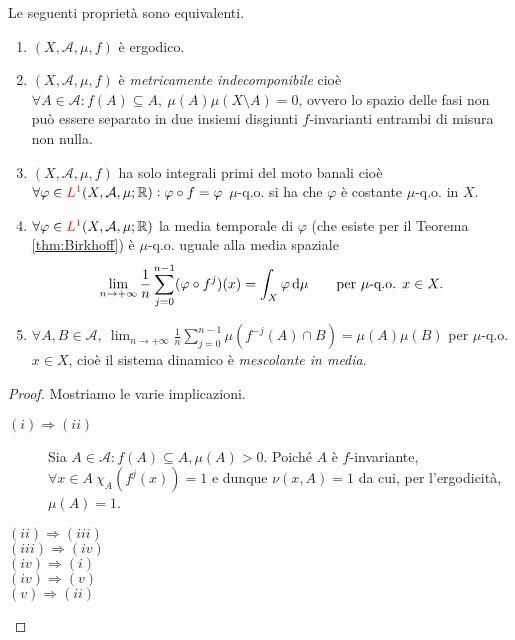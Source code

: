 \begin{thm}
    Le seguenti proprietà sono equivalenti.
    \begin{enumerate}[label=(\roman*)]
        \item $ (X, \mathcal{A}, \mu, f) $ è ergodico.
        \item $ (X, \mathcal{A}, \mu, f) $ è \emph{metricamente indecomponibile} cioè $ \forall A \in \mathcal{A} : f(A) \subseteq A, \ \mu(A) \mu(X \setminus A) = 0 $, ovvero lo spazio delle fasi non può essere separato in due insiemi disgiunti $ f $-invarianti entrambi di misura non nulla.
        \item $ (X, \mathcal{A}, \mu, f) $ ha solo integrali primi del moto banali cioè $ \forall \varphi \in \textcolor{red}{L^1}(X, \mathcal{A}, \mu; \mathbb{R}) : \varphi \circ f = \varphi $ $ \mu $-q.o. si ha che $ \varphi $ è costante $ \mu $-q.o. in $ X $.
        \item $ \forall \varphi \in \textcolor{red}{L^1}(X, \mathcal{A}, \mu; \mathbb{R}) $ la media temporale di $ \varphi $ (che esiste per il Teorema \ref{thm:Birkhoff}) è $ \mu $-q.o. uguale alla media spaziale
        \[
        \lim_{n \to +\infty} \frac{1}{n} \sum_{j=0}^{n-1} (\varphi \circ f^j)(x) = \int_{X} \varphi \dif{\mu} \qquad \text{per } \mu\text{-q.o. } x \in X.
        \]
        \item $ \forall A, B \in \mathcal{A}, \ \displaystyle{\lim_{n \to +\infty} \frac{1}{n} \sum_{j=0}^{n-1} \mu(f^{-j}(A) \cap B) = \mu(A) \mu(B)} $ per $ \mu $-q.o. $ x \in X $, cioè il sistema dinamico è \emph{mescolante in media}.
    \end{enumerate}
\end{thm}
\begin{proof}
    Mostriamo le varie implicazioni.
    \begin{description}
        \item[$ (i) \Rightarrow (ii) $] Sia $ A\in\mathcal{A} : f(A) \subseteq A, \mu(A) > 0 $. Poiché $ A $ è $ f $-invariante, $ \forall x\in A\ \chi_A(f^j(x)) = 1 $ e dunque $ \nu(x,A) = 1 $ da cui, per l'ergodicità, $ \mu(A) = 1 $.
        \item[$ (ii) \Rightarrow (iii) $]
        \item[$ (iii) \Rightarrow (iv) $]
        \item[$ (iv) \Rightarrow (i) $]
        \item[$ (iv) \Rightarrow (v) $]
        \item[$ (v) \Rightarrow (ii) $]
    \end{description}
\end{proof}

